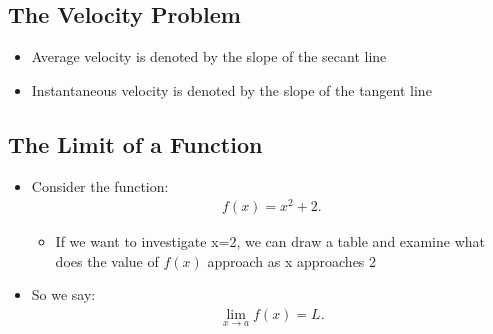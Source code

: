 \documentclass{report}
\begin{document}
    \bigbreak \noindent \bigbreak \noindent 
    \subsection{The Velocity Problem}
    \begin{itemize}
      \item Average velocity is denoted by the slope of the secant line 
      \item Instantaneous velocity is denoted by the slope of the tangent line
    \end{itemize}

    \bigbreak \noindent \bigbreak \noindent 
    \subsection{The Limit of a Function}
    \begin{itemize}
      \item Consider the function:
        \begin{align*}
          f(x) = x^{2} + 2
        .\end{align*}
        \begin{itemize}
          \item If we want to investigate x=2, we can draw a table and examine what does the value of $f(x)$ approach as x approaches 2
        \end{itemize}
      \item So we say:
        \begin{align*}
          \lim\limits_{x \to a}{f(x) = L}
        .\end{align*}
    \end{itemize}

    \bigbreak \noindent \bigbreak \noindent 
\end{document}
